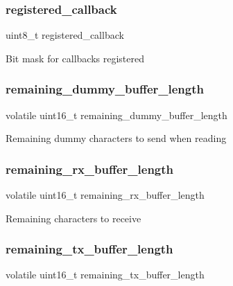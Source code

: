 \subsubsection{\texorpdfstring{registered\_callback}{registered\_callback}}
{\footnotesize\ttfamily uint8\+\_\+t registered\+\_\+callback}

Bit mask for callbacks registered \mbox{\label{structspi__module_a62c8fcf3ca37424b59c093dd9f56af3b}} 
\subsubsection{\texorpdfstring{remaining\_dummy\_buffer\_length}{remaining\_dummy\_buffer\_length}}
{\footnotesize\ttfamily volatile uint16\+\_\+t remaining\+\_\+dummy\+\_\+buffer\+\_\+length}

Remaining dummy characters to send when reading \mbox{\label{structspi__module_adbc4f86e8d157a19a354c981e1486865}} 
\subsubsection{\texorpdfstring{remaining\_rx\_buffer\_length}{remaining\_rx\_buffer\_length}}
{\footnotesize\ttfamily volatile uint16\+\_\+t remaining\+\_\+rx\+\_\+buffer\+\_\+length}

Remaining characters to receive \mbox{\label{structspi__module_a8031a02be57635012242eb4c9fb21934}} 
\subsubsection{\texorpdfstring{remaining\_tx\_buffer\_length}{remaining\_tx\_buffer\_length}}
{\footnotesize\ttfamily volatile uint16\+\_\+t remaining\+\_\+tx\+\_\+buffer\+\_\+length}

